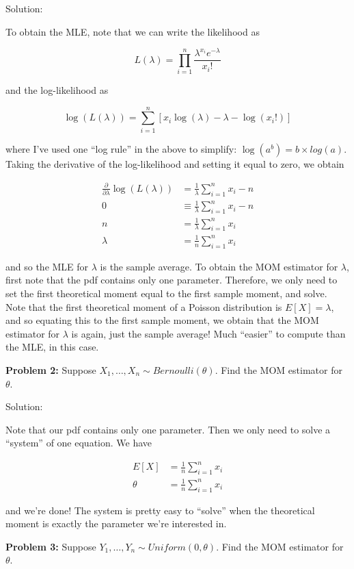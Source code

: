 \documentclass[
  letterpaper,
  DIV=11,
  numbers=noendperiod]{scrreprt}
\begin{document}
Solution:

To obtain the MLE, note that we can write the likelihood as

\[
L(\lambda) = \prod_{i = 1}^n \frac{\lambda^{x_i} e^{-\lambda}}{x_i!}
\]

and the log-likelihood as

\[
\log(L(\lambda)) = \sum_{i = 1}^n \left[ x_i\log(\lambda) - \lambda - \log(x_i!)\right]
\]

where I've used one ``log rule'' in the above to simplify:
\(\log(a^b) = b \times log(a)\). Taking the derivative of the
log-likelihood and setting it equal to zero, we obtain

\begin{align*}
  \frac{\partial}{\partial \lambda} \log(L(\lambda)) & = \frac{1}{\lambda} \sum_{i = 1}^n x_i - n \\
  0 & \equiv \frac{1}{\lambda} \sum_{i = 1}^n x_i - n \\
  n & = \frac{1}{\lambda} \sum_{i = 1}^n x_i \\
  \lambda & = \frac{1}{n} \sum_{i = 1}^n x_i
\end{align*}

and so the MLE for \(\lambda\) is the sample average. To obtain the MOM
estimator for \(\lambda\), first note that the pdf contains only one
parameter. Therefore, we only need to set the first theoretical moment
equal to the first sample moment, and solve. Note that the first
theoretical moment of a Poisson distribution is \(E[X] = \lambda\), and
so equating this to the first sample moment, we obtain that the MOM
estimator for \(\lambda\) is again, just the sample average! Much
``easier'' to compute than the MLE, in this case.

\textbf{Problem 2:} Suppose \(X_1, \dots, X_n \sim Bernoulli(\theta)\).
Find the MOM estimator for \(\theta\).

Solution:

Note that our pdf contains only one parameter. Then we only need to
solve a ``system'' of one equation. We have

\begin{align*}
  E[X] & = \frac{1}{n} \sum_{i = 1}^n x_i \\
  \theta & = \frac{1}{n} \sum_{i = 1}^n x_i
\end{align*}

and we're done! The system is pretty easy to ``solve'' when the
theoretical moment is exactly the parameter we're interested in.

\textbf{Problem 3:} Suppose \(Y_1, \dots, Y_n \sim Uniform(0, \theta)\).
Find the MOM estimator for \(\theta\).
\end{document}
